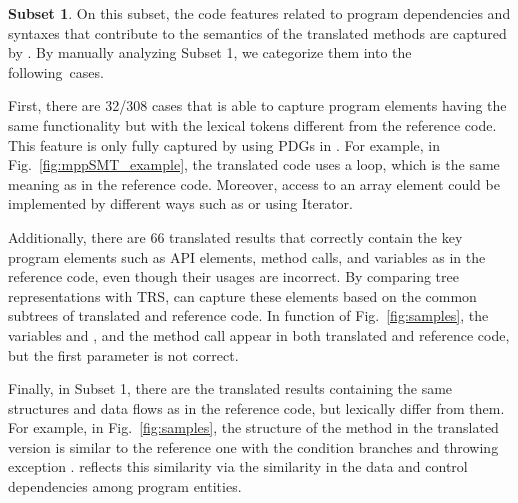 

\textbf{Subset 1}. On this subset, the code features related to
program dependencies and syntaxes that contribute to the semantics of
the translated methods are captured by {\model}. By manually analyzing
Subset 1, we categorize them into the following~cases.

First, there are 32/308 cases that {\model} is able to capture program
elements having the same functionality but with the lexical tokens
different from the reference code. This feature is only fully captured
by using PDGs in {\model}. For example, in
Fig.~\ref{fig:mppSMT_example}, the translated code uses a 
loop, which is the same meaning as  in the reference
code. Moreover, access to an array element could be implemented by
different ways such as  or using Iterator.
%

Additionally, there are 66 translated results that correctly contain
the key program elements such as API elements, method calls, and
variables as in the reference code, even though their usages are
incorrect. By comparing tree representations with TRS, {\model} can
capture these elements based on the common subtrees of translated and
reference code. In function  of
Fig.~\ref{fig:samples}, the variables  and
, and the method call  appear in
both translated and reference code, but the first parameter is not correct.
%

Finally, in Subset 1, there are the translated results containing the
same structures and data flows as in the reference code, but lexically
differ from them. For example, in Fig.~\ref{fig:samples}, the
structure of the method  in the translated version is
similar to the reference one with the condition branches  and
throwing exception . {\model} reflects
this similarity via the similarity in the data and control
dependencies among program entities.


